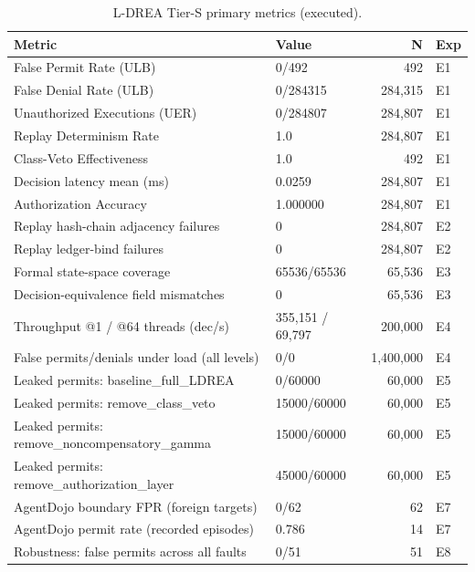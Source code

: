 \begin{table}[t]
\centering
\caption{L-DREA Tier-S primary metrics (executed).}
\label{tab:ldrea_primary}
\begin{tabular}{llrl}
\hline
Metric & Value & N & Exp \\
\hline
False Permit Rate (ULB) & 0/492 & 492 & E1 \\
False Denial Rate (ULB) & 0/284315 & 284,315 & E1 \\
Unauthorized Executions (UER) & 0/284807 & 284,807 & E1 \\
Replay Determinism Rate & 1.0 & 284,807 & E1 \\
Class-Veto Effectiveness & 1.0 & 492 & E1 \\
Decision latency mean (ms) & 0.0259 & 284,807 & E1 \\
Authorization Accuracy & 1.000000 & 284,807 & E1 \\
Replay hash-chain adjacency failures & 0 & 284,807 & E2 \\
Replay ledger-bind failures & 0 & 284,807 & E2 \\
Formal state-space coverage & 65536/65536 & 65,536 & E3 \\
Decision-equivalence field mismatches & 0 & 65,536 & E3 \\
Throughput @1 / @64 threads (dec/s) & 355,151 / 69,797 & 200,000 & E4 \\
False permits/denials under load (all levels) & 0/0 & 1,400,000 & E4 \\
Leaked permits: baseline\_full\_LDREA & 0/60000 & 60,000 & E5 \\
Leaked permits: remove\_class\_veto & 15000/60000 & 60,000 & E5 \\
Leaked permits: remove\_noncompensatory\_gamma & 15000/60000 & 60,000 & E5 \\
Leaked permits: remove\_authorization\_layer & 45000/60000 & 60,000 & E5 \\
AgentDojo boundary FPR (foreign targets) & 0/62 & 62 & E7 \\
AgentDojo permit rate (recorded episodes) & 0.786 & 14 & E7 \\
Robustness: false permits across all faults & 0/51 & 51 & E8 \\
\hline
\end{tabular}
\end{table}